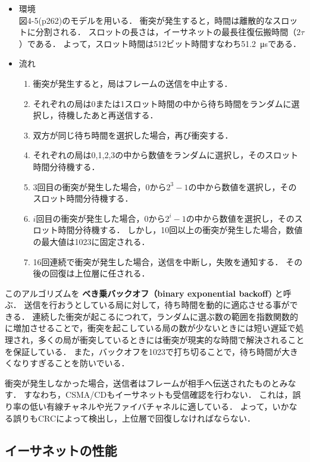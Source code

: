 \documentclass[a4paper]{ltjsarticle}
\providecommand{\tightlist}{%
  \setlength{\itemsep}{0pt}\setlength{\parskip}{0pt}}
\begin{document}
\begin{itemize}
\tightlist
\item
  環境\\
  図4-5(p262)のモデルを用いる．
  衝突が発生すると，時間は離散的なスロットに分割される．
  スロットの長さは，イーサネットの最長往復伝搬時間（\(2\tau\)）である．
  よって，スロット時間は512ビット時間すなわち\SI{51.2}{\micro s}である．
\item
  流れ

  \begin{enumerate}
  \def\labelenumi{\arabic{enumi}.}
  \tightlist
  \item
    衝突が発生すると，局はフレームの送信を中止する．
  \item
    それぞれの局は0または1スロット時間の中から待ち時間をランダムに選択し，待機したあと再送信する．
  \item
    双方が同じ待ち時間を選択した場合，再び衝突する．
  \item
    それぞれの局は0,1,2,3の中から数値をランダムに選択し，そのスロット時間分待機する．
  \item
    3回目の衝突が発生した場合，0から\(2^3 - 1\)の中から数値を選択し，そのスロット時間分待機する．
  \item
    \(i\)回目の衝突が発生した場合，0から\(2^i - 1\)の中から数値を選択し，そのスロット時間分待機する．
    しかし，10回以上の衝突が発生した場合，数値の最大値は1023に固定される．
  \item
    16回連続で衝突が発生した場合，送信を中断し，失敗を通知する．
    その後の回復は上位層に任される．
  \end{enumerate}
\end{itemize}

このアルゴリズムを \textbf{べき乗バックオフ（binary exponential
backoff)} と呼ぶ．
送信を行おうとしている局に対して，待ち時間を動的に適応させる事ができる．
連続した衝突が起こるにつれて，ランダムに選ぶ数の範囲を指数関数的に増加させることで，衝突を起こしている局の数が少ないときには短い遅延で処理され，多くの局が衝突しているときには衝突が現実的な時間で解決されることを保証している．
また，バックオフを1023で打ち切ることで，待ち時間が大きくなりすぎることを防いでいる．

衝突が発生しなかった場合，送信者はフレームが相手へ伝送されたものとみなす．
すなわち，CSMA/CDもイーサネットも受信確認を行わない．
これは，誤り率の低い有線チャネルや光ファイバチャネルに適している．
よって，いかなる誤りもCRCによって検出し，上位層で回復しなければならない．

\subsection{イーサネットの性能}\label{ux30a4ux30fcux30b5ux30cdux30c3ux30c8ux306eux6027ux80fd}
\end{document}
